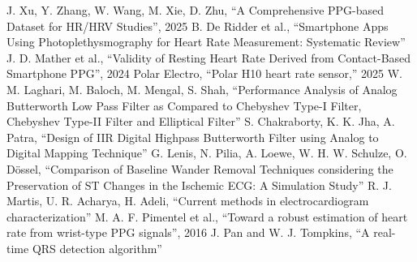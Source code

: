\documentclass[journal]{IEEEtran}
\begin{document}
\begin{thebibliography}{1}
J. Xu, Y. Zhang, W. Wang, M. Xie, D. Zhu, “A Comprehensive PPG-based Dataset for HR/HRV Studies”, 2025
B. De Ridder et al., “Smartphone Apps Using Photoplethysmography for Heart Rate Measurement: Systematic Review”
J. D. Mather et al., “Validity of Resting Heart Rate Derived from Contact-Based Smartphone PPG”, 2024
Polar Electro, “Polar H10 heart rate sensor,” 2025
W. M. Laghari, M. Baloch, M. Mengal, S. Shah, “Performance Analysis of Analog Butterworth Low Pass Filter as Compared to Chebyshev Type-I Filter, Chebyshev Type-II Filter and Elliptical Filter”
S. Chakraborty, K. K. Jha, A. Patra, “Design of IIR Digital Highpass Butterworth Filter using Analog to Digital Mapping Technique”
G. Lenis, N. Pilia, A. Loewe, W. H. W. Schulze, O. Dössel, “Comparison of Baseline Wander Removal Techniques considering the Preservation of ST Changes in the Ischemic ECG: A Simulation Study”
R. J. Martis, U. R. Acharya, H. Adeli, “Current methods in electrocardiogram characterization”
M. A. F. Pimentel et al., “Toward a robust estimation of heart rate from wrist-type PPG signals”, 2016
J. Pan and W. J. Tompkins, “A real-time QRS detection algorithm”
\end{thebibliography}
\end{document}
